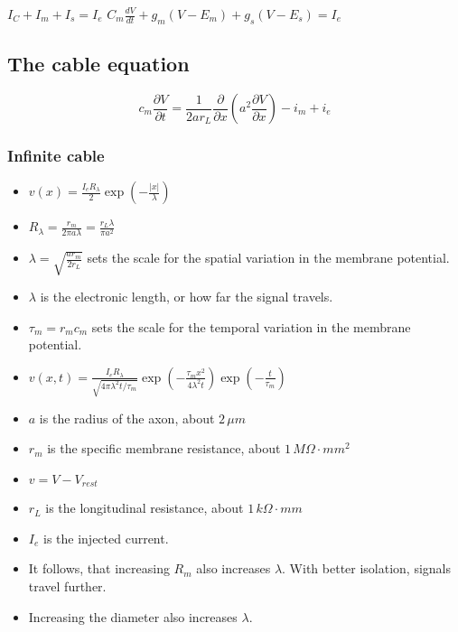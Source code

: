 \documentclass[main]{subfiles}
\begin{document}
$I_C + I_m + I_s = I_e$
$C_m \frac{dV}{dt} + g_m (V - E_m) + g_s(V - E_s) = I_e$


\subsection{The cable equation}
\[c_m\frac{\partial V}{\partial t} = \frac{1}{2ar_L}\frac{\partial}{\partial x}(a^2\frac{\partial V}{\partial x})-i_m+i_e\]
\begin{figure}[H]
	\centering
\end{figure}

\subsubsection{Infinite cable}
\begin{figure}[H]
	\centering
\end{figure}
\begin{itemize}[noitemsep,nolistsep]
	\item $v(x) = \frac{I_eR_\lambda}{2}\exp(-\frac{|x|}{\lambda})$
	\item $R_\lambda=\frac{r_m}{2\pi a\lambda} = \frac{r_L\lambda}{\pi a^2}$
	\item $\lambda = \sqrt{\frac{ar_m}{2r_L}}$ sets the scale for the spatial variation in the membrane potential.
	\item $\lambda$ is the electronic length, or how far the signal travels.
	\item $\tau_m = r_mc_m$ sets the scale for the temporal variation in the membrane potential.
	\item $v(x,t) = \frac{I_eR_\lambda}{\sqrt{4\pi\lambda^2t/\tau_m}}\exp(-\frac{\tau_mx^2}{4\lambda^2t})\exp(-\frac{t}{\tau_m})$
	\item $a$ is the radius of the axon, about $2\,\mu m$
	\item $r_m$ is the specific membrane resistance, about $1\,M\Omega\cdot mm^2$
	\item $v = V - V_{rest}$
	\item $r_L$ is the longitudinal resistance, about $1\,k\Omega\cdot mm$
	\item $I_e$ is the injected current.
	\item It follows, that increasing $R_m$ also increases $\lambda$. With better isolation, signals travel further.
	\item Increasing the diameter also increases $\lambda$.
\end{itemize}
\end{document}
